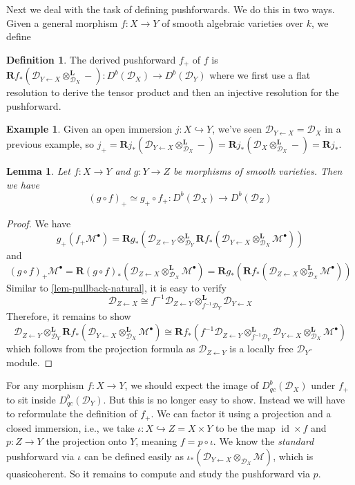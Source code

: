 \documentclass[11pt, a4paper]{article}
\newtheorem{lemma}[theorem]{Lemma}
\theoremstyle{definition}
\newtheorem{example}[theorem]{Example}
\newtheorem{definition}[theorem]{Definition}
\newcommand{\id}[0]{\operatorname{id}}
\newcommand{\dL}{\mathbf{L}}
\newcommand{\dR}{\mathbf{R}}
\begin{document}
    Next we deal with the task of defining pushforwards. We do this in two ways. Given a general morphism $f:X\to Y$ of smooth algebraic varieties over $k$, we define
    \begin{definition}
        The derived pushforward $f_+$ of $f$ is $\dR f_*(\mathcal D_{Y\leftarrow X}\otimes^{\dL}_{\mathcal D_X}-):D^b(\mathcal D_X)\to D^b(\mathcal D_Y)$ where we first use a flat resolution to derive the tensor product and then an injective resolution for the pushforward.
    \end{definition}
    \begin{example}\label{exp-open-immersion-pushforward}
        Given an open immersion $j:X\hookrightarrow Y$, we've seen $\mathcal D_{Y\leftarrow X}=\mathcal D_X$ in a previous example, so $j_+=\dR j_*(\mathcal D_{Y\leftarrow X}\otimes^{\dL}_{\mathcal D_X}-)=\dR j_*(\mathcal D_{X}\otimes^{\dL}_{\mathcal D_X}-)=\dR j_*$.
    \end{example}
    \begin{lemma}
        Let $f:X\to Y$ and $g:Y\to Z$ be morphisms of smooth varieties. Then we have
        \[(g\circ f)_+\simeq g_+\circ f_+:D^b(\mathcal D_X)\to D^b(\mathcal D_Z)\]
    \end{lemma}
    \begin{proof}
        We have
        \[g_+(f_+\mathcal M^\bullet)=\dR g_*(\mathcal D_{Z\leftarrow Y}\otimes^{\dL}_{\mathcal D_Y}\dR f_*(\mathcal D_{Y\leftarrow X}\otimes^{\dL}_{\mathcal D_X}\mathcal M^\bullet))\]
        and
        \[(g\circ f)_+\mathcal M^\bullet=\dR(g\circ f)_*(\mathcal D_{Z\leftarrow X}\otimes^{\dL}_{\mathcal D_X}\mathcal M^\bullet)=\dR g_*(\dR f_*(\mathcal D_{Z\leftarrow X}\otimes^{\dL}_{\mathcal D_X}\mathcal M^\bullet))\]
        Similar to \cref{lem-pullback-natural}, it is easy to verify
        \[\mathcal D_{Z\leftarrow X}\cong f^{-1}\mathcal D_{Z\leftarrow Y}\otimes^{\dL}_{f^{-1}\mathcal D_Y}\mathcal D_{Y\leftarrow X}\]
        Therefore, it remains to show
        \[\mathcal D_{Z\leftarrow Y}\otimes^{\dL}_{\mathcal D_Y}\dR f_*(\mathcal D_{Y\leftarrow X}\otimes^{\dL}_{\mathcal D_X}\mathcal M^\bullet)\cong \dR f_*(f^{-1}\mathcal D_{Z\leftarrow Y}\otimes^{\dL}_{f^{-1}\mathcal D_Y}\mathcal D_{Y\leftarrow X}\otimes_{\mathcal D_X}^\dL \mathcal M^\bullet)\]
        which follows from the projection formula as $\mathcal D_{Z\leftarrow Y}$ is a locally free $\mathcal D_Y$-module.
    \end{proof}
    For any morphism $f:X\to Y$, we should expect the image of $D^b_{qc}(\mathcal D_X)$ under $f_+$ to sit inside $D^b_{qc}(\mathcal D_Y)$. But this is no longer easy to show. Instead we will have to reformulate the definition of $f_+$. We can factor it using a projection and a closed immersion, i.e., we take $\iota:X\hookrightarrow Z=X\times Y$ to be the map $\id\times f$ and $p:Z\to Y$ the projection onto $Y$, meaning $f=p\circ \iota$. We know the \textit{standard} pushforward via $\iota$ can be defined easily as $\iota_*(\mathcal D_{Y\leftarrow X}\otimes_{\mathcal D_X}\mathcal M)$, which is quasicoherent. So it remains to compute and study the pushforward via $p$.
\end{document}

